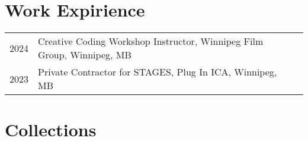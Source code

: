 \documentclass[12pt]{article}
\begin{document}
\begin{flushleft}
\section{Work Expirience}
\begin{tabular}{@{}lll}
2024 & Creative Coding Workshop Instructor, Winnipeg Film Group, Winnipeg, MB \\
2023 & Private Contractor for STAGES, Plug In ICA, Winnipeg, MB
\end{tabular}
\section{Collections}

\end{flushleft}
\end{document}
